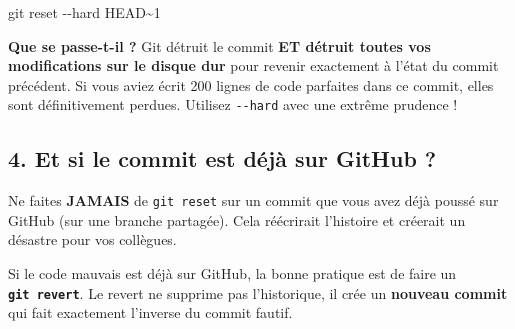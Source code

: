\documentclass[
  letterpaper,
  DIV=11,
  numbers=noendperiod]{scrreprt}
\newenvironment{Shaded}{\begin{snugshade}}{\end{snugshade}}
\newcommand{\AttributeTok}[1]{\textcolor[rgb]{0.40,0.45,0.13}{#1}}
\newcommand{\FunctionTok}[1]{\textcolor[rgb]{0.28,0.35,0.67}{#1}}
\newcommand{\NormalTok}[1]{\textcolor[rgb]{0.00,0.23,0.31}{#1}}
\begin{document}
\begin{tcolorbox}[enhanced jigsaw, arc=.35mm, bottomrule=.15mm, bottomtitle=1mm, breakable, colback=white, colbacktitle=quarto-callout-warning-color!10!white, colframe=quarto-callout-warning-color-frame, coltitle=black, left=2mm, leftrule=.75mm, opacityback=0, opacitybacktitle=0.6, rightrule=.15mm, title=\textcolor{quarto-callout-warning-color}{\faExclamationTriangle}\hspace{0.5em}{DANGER ZONE ☢️}, titlerule=0mm, toprule=.15mm, toptitle=1mm]

\begin{Shaded}
\begin{Highlighting}[]
\FunctionTok{git}\NormalTok{ reset }\AttributeTok{{-}{-}hard}\NormalTok{ HEAD\textasciitilde{}1}
\end{Highlighting}
\end{Shaded}

\textbf{Que se passe-t-il ?} Git détruit le commit \textbf{ET détruit
toutes vos modifications sur le disque dur} pour revenir exactement à
l'état du commit précédent. Si vous aviez écrit 200 lignes de code
parfaites dans ce commit, elles sont définitivement perdues. Utilisez
\texttt{-\/-hard} avec une extrême prudence !

\end{tcolorbox}

\subsection{4. Et si le commit est déjà sur GitHub
?}\label{et-si-le-commit-est-duxe9juxe0-sur-github}

\begin{tcolorbox}[enhanced jigsaw, arc=.35mm, bottomrule=.15mm, bottomtitle=1mm, breakable, colback=white, colbacktitle=quarto-callout-important-color!10!white, colframe=quarto-callout-important-color-frame, coltitle=black, left=2mm, leftrule=.75mm, opacityback=0, opacitybacktitle=0.6, rightrule=.15mm, title=\textcolor{quarto-callout-important-color}{\faExclamation}\hspace{0.5em}{Important}, titlerule=0mm, toprule=.15mm, toptitle=1mm]

Ne faites \textbf{JAMAIS} de \texttt{git\ reset} sur un commit que vous
avez déjà poussé sur GitHub (sur une branche partagée). Cela réécrirait
l'histoire et créerait un désastre pour vos collègues.

\end{tcolorbox}

Si le code mauvais est déjà sur GitHub, la bonne pratique est de faire
un \textbf{\texttt{git\ revert}}. Le revert ne supprime pas
l'historique, il crée un \textbf{nouveau commit} qui fait exactement
l'inverse du commit fautif.
\end{document}
